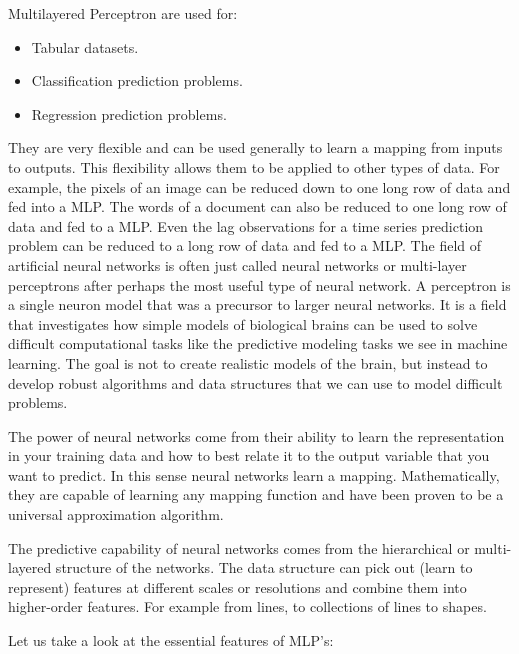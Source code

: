 \documentclass[12pt]{article}
\begin{document}
Multilayered Perceptron are used for:
\begin{itemize}
\item
Tabular datasets.
\item
Classification prediction problems.
\item
Regression prediction problems.
\end{itemize}
They are very flexible and can be used generally to learn a mapping from inputs to outputs. This flexibility allows them to be applied to other types of data. For example, the pixels of an image can be reduced down to one long row of data and fed into a MLP. The words of a document can also be reduced to one long row of data and fed to a MLP. Even the lag observations for a time series prediction problem can be reduced to a long row of data and fed to a MLP. The field of artificial neural networks is often just called neural networks or multi-layer perceptrons after perhaps the most useful type of neural network. A perceptron is a single neuron model that was a precursor to larger neural networks. It is a field that investigates how simple models of biological brains can be used to solve difficult computational tasks like the predictive modeling tasks we see in machine learning. The goal is not to create realistic models of the brain, but instead to develop robust algorithms and data structures that we can use to model difficult problems.

The power of neural networks come from their ability to learn the representation in your training data and how to best relate it to the output variable that you want to predict. In this sense neural networks learn a mapping. Mathematically, they are capable of learning any mapping function and have been proven to be a universal approximation algorithm.

The predictive capability of neural networks comes from the hierarchical or multi-layered structure of the networks. The data structure can pick out (learn to represent) features at different scales or resolutions and combine them into higher-order features. For example from lines, to collections of lines to shapes.

Let us take a look at the essential features of MLP's:
\end{document}
